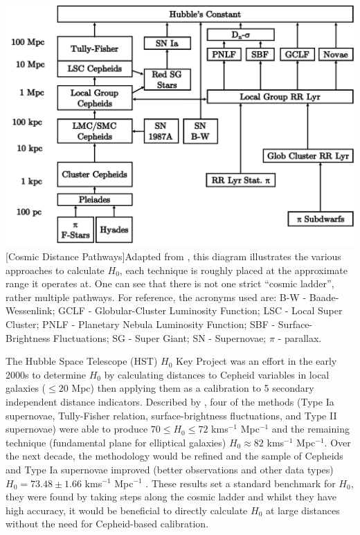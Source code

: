 \documentclass[12pt, onecolumn]{revtex4}    %
\begin{document}
\begin{center}
\includegraphics[width=0.8\linewidth]{figures/cosmic_distance_pathways}
[Cosmic Distance Pathways]{Adapted from \cite{jacoby_extragal}, this diagram illustrates the various approaches to calculate $H_0$, each technique is roughly placed at the approximate range it operates at. One can see that there is not one strict ``cosmic ladder'', rather multiple pathways. For reference, the acronyms used are: B-W - Baade-Wessenlink; GCLF - Globular-Cluster Luminosity Function; LSC - Local Super Cluster; PNLF - Planetary Nebula Luminosity Function; SBF - Surface-Brightness Fluctuations; SG - Super Giant; SN - Supernovae; $\pi$ - parallax.}
\label{fig:cosmic_pathways}
\end{center}

The Hubble Space Telescope (HST) $H_0$ Key Project was an effort in the early 2000s to determine $H_0$ by calculating distances to Cepheid variables in local galaxies ($\le 20$ Mpc) then applying them as a calibration to 5 secondary independent distance indicators. Described by \cite{freedman_hstkeystone}, four of the methods (Type Ia supernovae, Tully-Fisher relation, surface-brightness fluctuations, and Type II supernovae) were able to produce $70\le H_0 \le72$ kms$^{-1}$ Mpc$^{-1}$ and the remaining technique (fundamental plane for elliptical galaxies) $H_0\approx82$ kms$^{-1}$ Mpc$^{-1}$. Over the next decade, the methodology would be refined and the sample of Cepheids and Type Ia supernovae improved (better observations and other data types) $H_0=73.48 \pm1.66$ kms$^{-1}$ Mpc$^{-1}$ \citep{2011ApJ...730..119R, 2016ApJ...826...56R, 2018ApJ...855..136R}. These results set a standard benchmark for $H_0$, they were found by taking steps along the cosmic ladder and whilst they have high accuracy, it would be beneficial to directly calculate $H_0$ at large distances without the need for Cepheid-based calibration. \\
\end{document}
